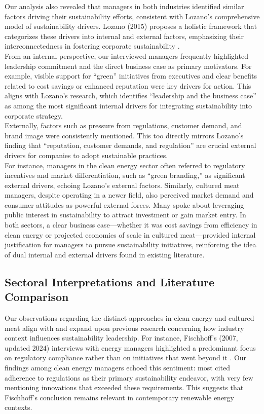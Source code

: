 	Our analysis also revealed that managers in both industries identified similar factors driving their sustainability efforts, consistent with Lozano’s comprehensive model of sustainability drivers. Lozano (2015) proposes a holistic framework that categorizes these drivers into internal and external factors, emphasizing their interconnectedness in fostering corporate sustainability \cite{Lozano2015}. \\
	
	From an internal perspective, our interviewed managers frequently highlighted leadership commitment and the direct business case as primary motivators. For example, visible support for ``green'' initiatives from executives and clear benefits related to cost savings or enhanced reputation were key drivers for action. This aligns with Lozano’s research, which identifies ``leadership and the business case'' as among the most significant internal drivers for integrating sustainability into corporate strategy. \\
	
	Externally, factors such as pressure from regulations, customer demand, and brand image were consistently mentioned. This too directly mirrors Lozano’s finding that ``reputation, customer demands, and regulation'' are crucial external drivers for companies to adopt sustainable practices. \\
	
	For instance, managers in the clean energy sector often referred to regulatory incentives and market differentiation, such as ``green branding,'' as significant external drivers, echoing Lozano’s external factors. Similarly, cultured meat managers, despite operating in a newer field, also perceived market demand and consumer attitudes as powerful external forces. Many spoke about leveraging public interest in sustainability to attract investment or gain market entry. In both sectors, a clear business case—whether it was cost savings from efficiency in clean energy or projected economies of scale in cultured meat—provided internal justification for managers to pursue sustainability initiatives, reinforcing the idea of dual internal and external drivers found in existing literature. \\
	
	\subsection{Sectoral Interpretations and Literature Comparison}
	Our observations regarding the distinct approaches in clean energy and cultured meat align with and expand upon previous research concerning how industry context influences sustainability leadership. For instance, Fischhoff’s (2007, updated 2024) interviews with energy managers highlighted a predominant focus on regulatory compliance rather than on initiatives that went beyond it \cite{Fischhoff2024}. Our findings among clean energy managers echoed this sentiment: most cited adherence to regulations as their primary sustainability endeavor, with very few mentioning innovations that exceeded these requirements. This suggests that Fischhoff’s conclusion remains relevant in contemporary renewable energy contexts. \\
	
